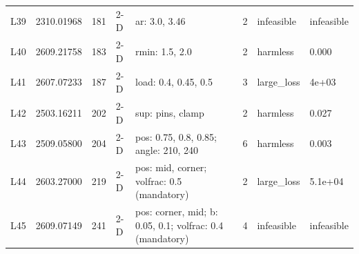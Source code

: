 \begin{table}[t]
\begin{tabular}{lllllrll}
L39 & 2310.01968 & 181 & 2-D & ar: 3.0, 3.46 & 2 & infeasible & infeasible \\
L40 & 2609.21758 & 183 & 2-D & rmin: 1.5, 2.0 & 2 & harmless & 0.000 \\
L41 & 2607.07233 & 187 & 2-D & load: 0.4, 0.45, 0.5 & 3 & large\_loss & 4e+03 \\
L42 & 2503.16211 & 202 & 2-D & sup: pins, clamp & 2 & harmless & 0.027 \\
L43 & 2509.05800 & 204 & 2-D & pos: 0.75, 0.8, 0.85; angle: 210, 240 & 6 & harmless & 0.003 \\
L44 & 2603.27000 & 219 & 2-D & pos: mid, corner; volfrac: 0.5 (mandatory) & 2 & large\_loss & 5.1e+04 \\
L45 & 2609.07149 & 241 & 2-D & pos: corner, mid; b: 0.05, 0.1; volfrac: 0.4 (mandatory) & 4 & infeasible & infeasible \\
\bottomrule
\end{tabular}
\end{table}
